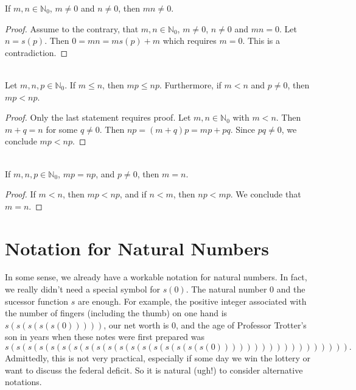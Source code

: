 \begin{lemma}
If $m,n\in \mathbb{N}_0$, $m\neq0$ and $n\neq0$, then $mn\neq0$.
\end{lemma}
\begin{proof}
Assume to the contrary, that $m,n\in \mathbb{N}_0$, $m\neq0$, $n\neq0$
and $mn=0$.  Let $n=s(p)$.  Then $0=mn= ms(p)+m$ which requires
$m=0$.  This is a contradiction.
\end{proof}

\begin{theorem}{}\\  
Let $m,n,p\in \mathbb{N}_0$.  If
$m\le n$, then $mp\le np$.  Furthermore, if $m<n$ and $p\neq0$,
then $mp<np$.
\end{theorem}

\begin{proof} Only the last statement requires proof.  Let 
$m,n\in\mathbb{N}_0$ with $m< n$.  Then $m+q=n$ for some $q\neq0$.
Then $np=(m+q)p=mp+pq$.  Since $pq\neq0$, we conclude $mp<np$.
\end{proof}

\begin{corollary}{}\\
If $m,n,p\in \mathbb{N}_0$, $mp=np$, and $p\neq 0$, then $m=n$.
\end{corollary}

\begin{proof}
If $m<n$, then $mp<np$, and if $n<m$, then
$np<mp$.  We conclude that $m=n$. 
\end{proof}

\section{Notation for Natural Numbers}\label{s:decimal}

In some sense, we already have a workable notation for natural numbers.
In fact, we really didn't need a special symbol for $s(0)$.
The natural number $0$ and the sucessor function $s$ are enough.
For example, the positive integer associated
with the number of fingers (including the thumb) 
on one hand is
$s(s(s(s(s(0)))))$, our net worth is $0$, and the age of Professor
Trotter's son in years when these notes were first prepared was
\[
s(s(s(s(s(s(s(s(s(s(s(s(s(s(s(s(s(s(0)))))))))))))))))).
\]
Admittedly, this is not very practical, especially if some day
we win the lottery or want to discuss the federal deficit. 
So it is natural (ugh!) to consider alternative notations.  

